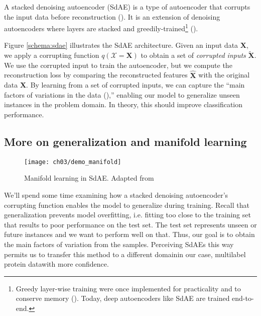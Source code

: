 \par A stacked denoising autoencoder (SdAE) is a type of autoencoder that
corrupts the input data before reconstruction (\cite{vincent2010stacked}). It
is an extension of denoising autoencoders where layers are stacked and
greedily-trained\footnote{Greedy layer-wise training were once implemented
for practicality and to conserve memory (\cite{bengio2007greedy}). Today,
deep autoencoders like SdAE are trained end-to-end.}
(\cite{vincent2008denoising}).

\par Figure \ref{schema:sdae} illustrates the SdAE architecture. Given an
input data $\mathbf{X}$, we apply a corrupting function
$q(\mathcal{X}=\mathbf{X})$ to obtain a set of \textit{corrupted inputs}
$\mathbf{\widetilde{X}}$. We use the corrupted input to train the
autoencoder, but we compute the reconstruction loss by comparing the
reconstructed features $\mathbf{\widehat{X}}$ with the original data
$\mathbf{X}$. By learning from a set of corrupted inputs, we can capture the
``main factors of variations in the data (\cite{vincent2008denoising}),''
enabling our model to generalize unseen instances in the problem domain.
In theory, this should improve classification performance.

\subsection{More on generalization and manifold learning}

\begin{wrapfigure}{r}{0.5\textwidth}
  \centering
  \texttt{[image: ch03/demo\_manifold]}
  \caption[Manifold demonstration in SdAE]{Manifold learning in SdAE. Adapted
  from \cite{vincent2008denoising}}
  \label{demo:manifold}
\end{wrapfigure}

\par We'll spend some time examining how a stacked denoising autoencoder's
corrupting function enables the model to generalize during training. Recall
that generalization prevents model overfitting, i.e. fitting too close to the
training set that results to poor performance on the test set. The test set
represents unseen or future instances and we want to perform well on that.
Thus, our goal is to obtain the main factors of variation from the samples.
Perceiving SdAEs this way permits us to transfer this method to a different
domain\textemdash in our case, multilabel protein data\textemdash with more
confidence.

